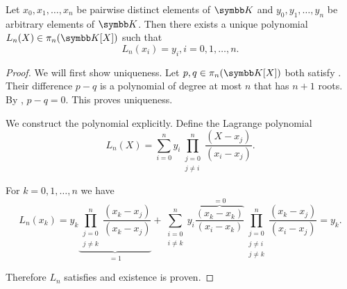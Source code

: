 \begin{theorem}\label{thm:lagrange_interpolation}
  Let \( x_0, x_1, \ldots, x_n \) be pairwise distinct elements of \( \BK \) and \( y_0, y_1, \ldots, y_n \) be arbitrary elements of \( \BK \). Then there exists a unique polynomial \( L_n(X) \in \pi_n(\BK[X]) \) such that
  \begin{equation}\label{thm:lagrange_interpolation/condition}
    L_n(x_i) = y_i, i = 0, 1, \ldots, n.
  \end{equation}
\end{theorem}
\begin{proof}
  We will first show uniqueness. Let \( p, q \in \pi_n(\BK[X]) \) both satisfy . Their difference \( p - q \) is a polynomial of degree at most \( n \) that has \( n + 1 \) roots. By , \( p - q = 0 \). This proves uniqueness.

  We construct the polynomial explicitly. Define the Lagrange polynomial
  \begin{equation*}
    L_n(X) = \sum_{i=0}^n y_i \prod_{\substack{j = 0 \\ j \neq i}}^n \frac {(X - x_j)} {(x_i - x_j)}.
  \end{equation*}

  For \( k = 0, 1, \ldots, n \) we have
  \begin{equation*}
    L_n(x_k) = y_k \underbrace{\prod_{\substack{j = 0 \\ j \neq k}}^n \frac {(x_k - x_j)} {(x_k - x_j)}}_{=1} + \sum_{\substack{i = 0 \\ i \neq k}}^n y_i \overbrace{\frac{(x_k - x_k)}{(x_i - x_k)}}^{=0} \prod_{\substack{j = 0 \\ j \neq i \\ j \neq k}}^n \frac {(x_k - x_j)} {(x_i - x_j)} = y_k.
  \end{equation*}

  Therefore \( L_n \) satisfies  and existence is proven.
\end{proof}
